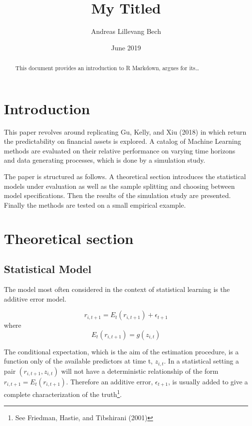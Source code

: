 \documentclass[]{article}
\title{My Titled}
\author{Andreas Lillevang Bech}
\date{June 2019}
\let\rmarkdownfootnote\footnote%
\def\footnote{\protect\rmarkdownfootnote}
\begin{document}
\maketitle
\begin{abstract}
This document provides an introduction to R Markdown, argues for
its\ldots{}
\end{abstract}

\hypertarget{introduction}{%
\section{Introduction}\label{introduction}}

This paper revolves around replicating Gu, Kelly, and Xiu (2018) in
which return the predictability on financial assets is explored. A
catalog of Machine Learning methods are evaluated on their relative
performance on varying time horizons and data generating processes,
which is done by a simulation study.

The paper is structured as follows. A theoretical section introduces the
statistical models under evaluation as well as the sample splitting and
choosing between model specifications. Then the results of the
simulation study are presented. Finally the methods are tested on a
small empirical example.

\hypertarget{theoretical-section}{%
\section{Theoretical section}\label{theoretical-section}}

\hypertarget{statistical-model}{%
\subsection{Statistical Model}\label{statistical-model}}

The model most often considered in the context of statistical learning
is the additive error model.

\[r_{i,t+1} = E_t(r_{i,t+1}) + \epsilon_{t+1}\] where
\[E_t(r_{i,t+1}) = g(z_{i,t})\]

The conditional expectation, which is the aim of the estimation
procedure, is a function only of the available predictors at time t,
\(z_{i,t}\). In a statistical setting a pair \((r_{i,t+1},z_{i,t})\)
will not have a deterministic relationship of the form
\(r_{i,t+1} = E_t(r_{i,t+1})\). Therefore an additive error,
\(\epsilon_{t+1}\), is usually added to give a complete characterization
of the truth\footnote{See Friedman, Hastie, and Tibshirani (2001)}.
\end{document}

